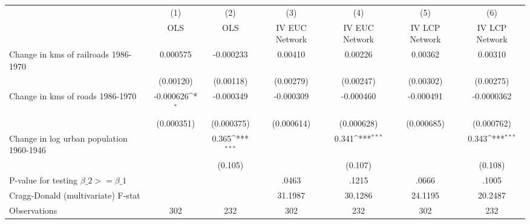 {
\def\sym#1{\ifmmode^{#1}\else\(^{#1}\)\fi}
\begin{tabular}{l*{6}{c}}
\hline\hline
                &\multicolumn{1}{c}{(1)}&\multicolumn{1}{c}{(2)}&\multicolumn{1}{c}{(3)}&\multicolumn{1}{c}{(4)}&\multicolumn{1}{c}{(5)}&\multicolumn{1}{c}{(6)}\\
                &\multicolumn{1}{c}{OLS}&\multicolumn{1}{c}{OLS}&\multicolumn{1}{c}{IV EUC Network}&\multicolumn{1}{c}{IV EUC Network}&\multicolumn{1}{c}{IV LCP Network}&\multicolumn{1}{c}{IV LCP Network}\\
\hline
Change in kms of railroads 1986-1970& 0.000575         &-0.000233         &  0.00410         &  0.00226         &  0.00362         &  0.00310         \\
                &(0.00120)         &(0.00118)         &(0.00279)         &(0.00247)         &(0.00302)         &(0.00275)         \\
[1em]
Change in kms of roads 1986-1970&-0.000626\sym{*}  &-0.000349         &-0.000309         &-0.000460         &-0.000491         &-0.0000362         \\
                &(0.000351)         &(0.000375)         &(0.000614)         &(0.000628)         &(0.000685)         &(0.000762)         \\
[1em]
Change in log urban population 1960-1946&                  &    0.365\sym{***}&                  &    0.341\sym{***}&                  &    0.343\sym{***}\\
                &                  &  (0.105)         &                  &  (0.107)         &                  &  (0.108)         \\
\hline
P-value for testing $\beta\_{2} >= \beta\_{1}$&                  &                  &    .0463         &    .1215         &    .0666         &    .1005         \\
Cragg-Donald (multivariate) F-stat&                  &                  &  31.1987         &  30.1286         &  24.1195         &  20.2487         \\
Observations    &      302         &      232         &      302         &      232         &      302         &      232         \\
\hline\hline
\end{tabular}
}
